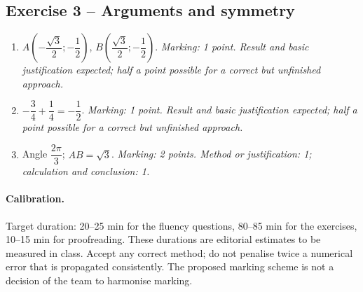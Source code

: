 \subsection*{Exercise 3 -- Arguments and symmetry}
\begin{enumerate}
\item $A(-\dfrac{\sqrt 3}{2};-\dfrac{1}{2})$, $B(\dfrac{\sqrt 3}{2};-\dfrac{1}{2})$. \textit{Marking: 1 point. Result and basic justification expected; half a point possible for a correct but unfinished approach.}
\item $-\dfrac{3}{4}+\dfrac{1}{4}=-\dfrac{1}{2}$. \textit{Marking: 1 point. Result and basic justification expected; half a point possible for a correct but unfinished approach.}
\item Angle $\dfrac{2\pi}{3}$; $AB=\sqrt3$. \textit{Marking: 2 points. Method or justification: 1; calculation and conclusion: 1.}
\end{enumerate}
\paragraph{Calibration.} Target duration: 20--25 min for the fluency questions, 80--85 min for the exercises, 10--15 min for proofreading. These durations are editorial estimates to be measured in class. Accept any correct method; do not penalise twice a numerical error that is propagated consistently. The proposed marking scheme is not a decision of the team to harmonise marking.
